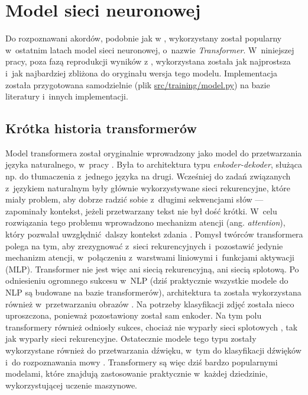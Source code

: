\section{Model sieci neuronowej}

Do rozpoznawani akordów, podobnie jak w \cite{park_bi-directional_2019}, wykorzystany został popularny w~ostatnim latach model sieci neuronowej, o~nazwie \emph{Transformer}. W~niniejszej pracy, poza fazą reprodukcji wyników z \cite{park_bi-directional_2019}, wykorzystana została jak najprostsza i~jak najbardziej zbliżona do oryginału wersja tego modelu. Implementacja została przygotowana samodzielnie (plik \url{src/training/model.py}) na bazie literatury i~innych implementacji.


\subsection{Krótka historia transformerów}

Model transformera został oryginalnie wprowadzony jako model do przetwarzania języka naturalnego, w~pracy \cite{vaswani_attention_2017}. Była to architektura typu \emph{enkoder-dekoder}, służąca np.  do tłumaczenia z~jednego języka na drugi. Wcześniej do zadań związanych z~językiem naturalnym były głównie wykorzystywane sieci rekurencyjne, które miały problem, aby dobrze radzić sobie z~długimi sekwencjami słów --- zapominały kontekst, jeżeli przetwarzany tekst nie był dość krótki. W~celu rozwiązania tego problemu wprowadzono mechanizm atencji (ang. \emph{attention}), który pozwalał uwzględnić dalszy kontekst zdania \cite{bahdanau_neural_2016}. Pomysł twórców transformera polega na tym, aby zrezygnować z~sieci rekurencyjnych i~pozostawić jedynie mechanizm atencji, w~połączeniu z~warstwami liniowymi i~funkcjami aktywacji (MLP). Transformer nie jest więc ani siecią rekurencyjną, ani siecią splotową. Po odniesieniu ogromnego sukcesu w~NLP (dziś praktycznie wszystkie modele do NLP są budowane na bazie transformerów), architektura ta została wykorzystana również w~przetwarzaniu obrazów \cite{dosovitskiy_image_2021}. Na potrzeby klasyfikacji zdjęć została nieco uproszczona, ponieważ pozostawiony został sam enkoder. Na tym polu transformery również odniosły sukces, chociaż nie wyparły sieci splotowych \cite{liu_convnet_2022}, tak jak wyparły sieci rekurencyjne. Ostatecznie modele tego typu zostały wykorzystane również do przetwarzania dźwięku, w~tym do klasyfikacji dźwięków \cite{gong_ast_2021} i~do rozpoznawania mowy \cite{kim_squeezeformer_2022}. Transformery są więc dziś bardzo popularnymi modelami, które znajdują zastosowanie praktycznie w~każdej dziedzinie, wykorzystującej uczenie maszynowe.

